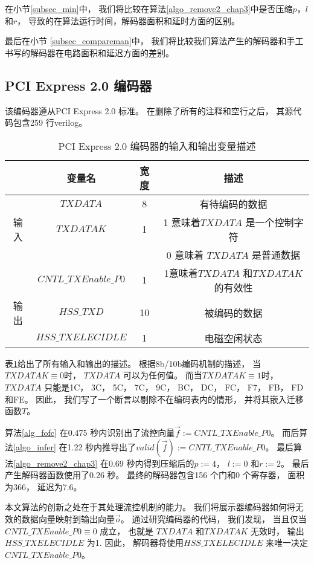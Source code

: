 在小节\ref{subsec_min}中，
我们将比较在算法\ref{algo_remove2_chap3}中是否压缩$p$，$l$ 和$r$，
导致的在算法运行时间，解码器面积和延时方面的区别。

最后在小节 \ref{subsec_compareman}中，
我们将比较我们算法产生的解码器和手工书写的解码器在电路面积和延迟方面的差别。


\subsection{PCI Express 2.0 编码器}\label{subsec_pcie2}
该编码器遵从PCI Express 2.0 标准。
在删除了所有的注释和空行之后，
其源代码包含259 行verilog。

\begin{table}[b]%
\caption{PCI Express 2.0 编码器的输入和输出变量描述}
\label{tab:pcieio}
\centering
\begin{tabular}{|c|c|c|c|}
\hline
         & 变量名               & 宽度  &描述\\\hline\hline
         & $TXDATA$             & 8     &有待编码的数据\\\cline{2-4}
输入     & $TXDATAK$            & 1     &1 意味着$TXDATA$ 是一个控制字符 \\
         &                      &       &0 意味着 $TXDATA$ 是普通数据\\\cline{2-4}
         & $CNTL\_TXEnable\_P0$ & 1     &1意味着$TXDATA$ 和$TXDATAK$的有效性\\\hline
输出     & $HSS\_TXD$           & 10    &被编码的数据\\\cline{2-4}
         & $HSS\_TXELECIDLE$    & 1     &电磁空闲状态\\\hline
\end{tabular}
\end{table}%

表\ref{tab:pcieio}给出了所有输入和输出的描述。
根据8b/10b编码机制的描述，
当 $TXDATAK\equiv 0$时，
$TXDATA$ 可以为任何值。
而当$TXDATAK\equiv 1$时，
$TXDATA$ 只能是1C， 3C， 5C， 7C， 9C， BC， DC， FC， F7， FB， FD 和FE。
因此，
我们写了一个断言以剔除不在编码表内的情形，
并将其嵌入迁移函数$T$。

算法\ref{alg_fofc} 在0.475 秒内识别出了流控向量$\vec{f}:=CNTL\_TXEnable\_P0$。
而后算法\ref{algo_infer} 在1.22 秒内推导出了$valid(\vec{f}):=CNTL\_TXEnable\_P0$。
最后算法\ref{algo_remove2_chap3} 在0.69 秒内得到压缩后的$p:=4$， $l:=0$ 和$r:=2$。
最后
产生解码器函数使用了0.26 秒。
最终的解码器包含156 个门和0 个寄存器，
面积为366，
延迟为7.6。


本文算法的创新之处在于其处理流控机制的能力。
我们将展示器编码器如何将无效的数据向量映射到输出向量$\vec{o}$。
通过研究编码器的代码，
我们发现，
当且仅当$CNTL\_TXEnable\_P0\equiv 0$ 成立，
也就是
$TXDATA$ 和$TXDATAK$ 无效时，
输出$HSS\_TXELECIDLE$ 为1.
因此，
解码器将使用$HSS\_TXELECIDLE$ 来唯一决定$CNTL\_TXEnable\_P0$。

